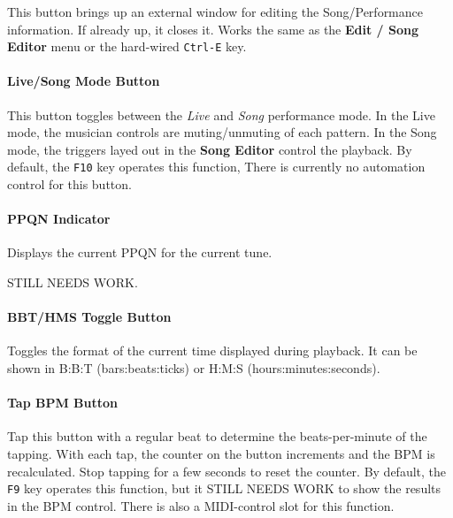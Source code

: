 \documentclass[
 11pt,
 twoside,
 a4paper,
 headinclude,
 footinclude,
 final                                 %
]{article}
\begin{document}
   This button brings up an external window for editing the Song/Performance
   information.  If already up, it closes it.  Works the same as the
   \textbf{Edit / Song Editor} menu or the hard-wired \texttt{Ctrl-E} key.

\paragraph{Live/Song Mode Button}
\label{paragraph:introduction_livesong_mode_button}

   This button toggles between the \textsl{Live} and \textsl{Song} performance
   mode. In the Live mode, the musician controls are muting/unmuting of each
   pattern.  In the Song mode, the triggers layed out in the
   \textbf{Song Editor} control the playback.
   By default, the \texttt{F10} key operates this function,
   There is currently no automation control for this button.

\paragraph{PPQN Indicator}
\label{paragraph:introduction_ppqn_indicator}

   Displays the current PPQN for the current tune.

   STILL NEEDS WORK.

\paragraph{BBT/HMS Toggle Button}
\label{paragraph:introduction_time_format_toggle_button}

   Toggles the format of the current time displayed during playback. 
   It can be shown in B:B:T (bars:beats:ticks) or H:M:S (hours:minutes:seconds).

\paragraph{Tap BPM Button}
\label{paragraph:introduction_tap_bpm_button}

   Tap this button with a regular beat to determine the beats-per-minute of the
   tapping.  With each tap, the counter on the button increments and the BPM is
   recalculated.  Stop tapping for a few seconds to reset the counter.
   By default, the \texttt{F9} key operates this function, but it
   STILL NEEDS WORK to show the results in the BPM control.
   There is also a MIDI-control slot for this function.
\end{document}
